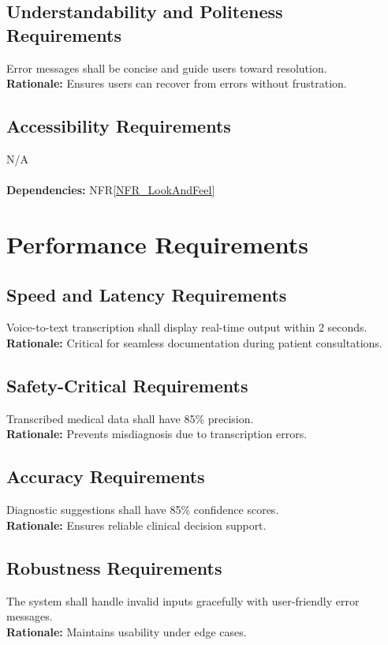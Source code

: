 \documentclass[12pt]{article}
\begin{document}
\begin{itemize}
\subsection{Understandability and Politeness Requirements}
Error messages shall be concise and guide users toward resolution.  \\
\textbf{Rationale:} Ensures users can recover from errors without frustration.

\subsection{Accessibility Requirements}
N/A
\\
  \\
\textbf{Dependencies:} NFR\ref{NFR_LookAndFeel}

\section{Performance Requirements} \label{NFR_Performance}
\subsection{Speed and Latency Requirements}
Voice-to-text transcription shall display real-time output within 2 seconds.  \\
\textbf{Rationale:} Critical for seamless documentation during patient consultations.

\subsection{Safety-Critical Requirements}
Transcribed medical data shall have 85\% precision.  \\
\textbf{Rationale:} Prevents misdiagnosis due to transcription errors.

\subsection{Accuracy Requirements}
Diagnostic suggestions shall have 85\% confidence scores.  \\
\textbf{Rationale:} Ensures reliable clinical decision support.

\subsection{Robustness Requirements}
The system shall handle invalid inputs gracefully with user-friendly error messages.  \\
\textbf{Rationale:} Maintains usability under edge cases.


\end{itemize}
\end{document}
